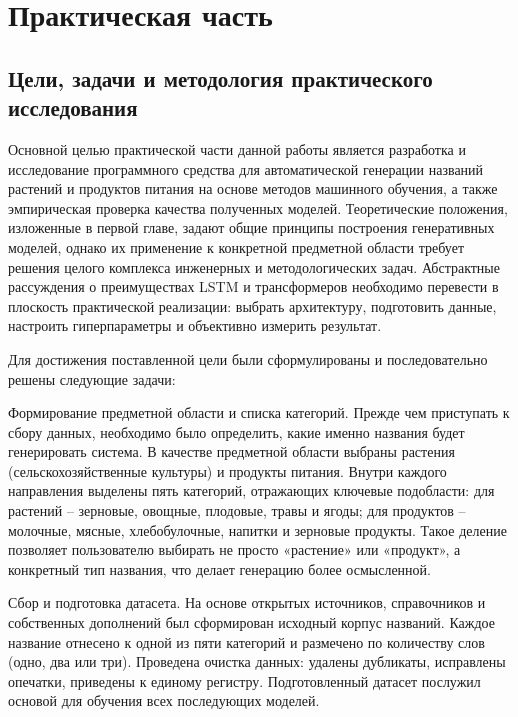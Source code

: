 \chapter{Практическая часть}\label{ux43fux440ux430ux43aux442ux438ux447ux435ux441ux43aux430ux44f-ux447ux430ux441ux442ux44c}

\section{Цели, задачи и методология практического исследования}\label{ux446ux435ux43bux438-ux437ux430ux434ux430ux447ux438-ux438-ux43cux435ux442ux43eux434ux43eux43bux43eux433ux438ux44f-ux43fux440ux430ux43aux442ux438ux447ux435ux441ux43aux43eux433ux43e-ux438ux441ux441ux43bux435ux434ux43eux432ux430ux43dux438ux44f}

Основной целью практической части данной работы является разработка и исследование программного средства для автоматической генерации названий растений и продуктов питания на основе методов машинного обучения, а также эмпирическая проверка качества полученных моделей. Теоретические положения, изложенные в первой главе, задают общие принципы построения генеративных моделей, однако их применение к конкретной предметной области требует решения целого комплекса инженерных и методологических задач. Абстрактные рассуждения о преимуществах LSTM и трансформеров необходимо перевести в плоскость практической реализации: выбрать архитектуру, подготовить данные, настроить гиперпараметры и объективно измерить результат.

Для достижения поставленной цели были сформулированы и последовательно решены следующие задачи:

Формирование предметной области и списка категорий. Прежде чем приступать к сбору данных, необходимо было определить, какие именно названия будет генерировать система. В качестве предметной области выбраны растения (сельскохозяйственные культуры) и продукты питания. Внутри каждого направления выделены пять категорий, отражающих ключевые подобласти: для растений -- зерновые, овощные, плодовые, травы и ягоды; для продуктов -- молочные, мясные, хлебобулочные, напитки и зерновые продукты. Такое деление позволяет пользователю выбирать не просто «растение» или «продукт», а конкретный тип названия, что делает генерацию более осмысленной.

Сбор и подготовка датасета. На основе открытых источников, справочников и собственных дополнений был сформирован исходный корпус названий. Каждое название отнесено к одной из пяти категорий и размечено по количеству слов (одно, два или три). Проведена очистка данных: удалены дубликаты, исправлены опечатки, приведены к единому регистру. Подготовленный датасет послужил основой для обучения всех последующих моделей.

